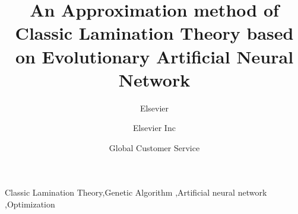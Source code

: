 \documentclass[review]{elsarticle}
\begin{document}
\begin{frontmatter}

\title{An Approximation method of Classic Lamination Theory based on Evolutionary Artificial Neural Network}

\author{Elsevier}
\address{Radarweg 29, Amsterdam}

\author[mymainaddress,mysecondaryaddress]{Elsevier Inc}

\author[mysecondaryaddress]{Global Customer Service}

\address[mymainaddress]{1600 John F Kennedy Boulevard, Philadelphia}
\address[mysecondaryaddress]{360 Park Avenue South, New York}

\begin{abstract}

\end{abstract}

\begin{keyword}
Classic Lamination Theory\sep Genetic Algorithm \sep Artificial neural network
\sep Optimization
\end{keyword}

\end{frontmatter}














\end{document}

